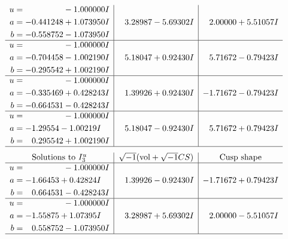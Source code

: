 \documentclass[1p]{elsarticle_modified}
\theoremstyle{definition}
\newcommand{\I}{\sqrt{-1}}
\begin{document}
$$\begin{array}{c|c|c}
\begin{aligned}
u &= \phantom{-0.000000 } -1.000000 I \\
a &= -0.441248 + 1.073950 I \\
b &= -0.558752 - 1.073950 I\end{aligned}
 & \phantom{-}3.28987 - 5.69302 I & \phantom{-}2.00000 + 5.51057 I \\ \hline\begin{aligned}
u &= \phantom{-0.000000 } -1.000000 I \\
a &= -0.704458 - 1.002190 I \\
b &= -0.295542 + 1.002190 I\end{aligned}
 & \phantom{-}5.18047 + 0.92430 I & \phantom{-}5.71672 - 0.79423 I \\ \hline\begin{aligned}
u &= \phantom{-0.000000 } -1.000000 I \\
a &= -0.335469 + 0.428243 I \\
b &= -0.664531 - 0.428243 I\end{aligned}
 & \phantom{-}1.39926 + 0.92430 I & -1.71672 - 0.79423 I \\ \hline\begin{aligned}
u &= \phantom{-0.000000 } -1.000000 I \\
a &= -1.29554 - 1.00219 I \\
b &= \phantom{-}0.295542 + 1.002190 I\end{aligned}
 & \phantom{-}5.18047 - 0.92430 I & \phantom{-}5.71672 + 0.79423 I\\
 \hline 
 \end{array}$$\newpage$$\begin{array}{c|c|c}  
\text{Solutions to }I^u_{3}& \I (\text{vol} + \sqrt{-1}CS) & \text{Cusp shape}\\
 \hline 
\begin{aligned}
u &= \phantom{-0.000000 } -1.000000 I \\
a &= -1.66453 + 0.42824 I \\
b &= \phantom{-}0.664531 - 0.428243 I\end{aligned}
 & \phantom{-}1.39926 - 0.92430 I & -1.71672 + 0.79423 I \\ \hline\begin{aligned}
u &= \phantom{-0.000000 } -1.000000 I \\
a &= -1.55875 + 1.07395 I \\
b &= \phantom{-}0.558752 - 1.073950 I\end{aligned}
 & \phantom{-}3.28987 + 5.69302 I & \phantom{-}2.00000 - 5.51057 I\\
 \hline 
 \end{array}$$\newpage
\end{document}
